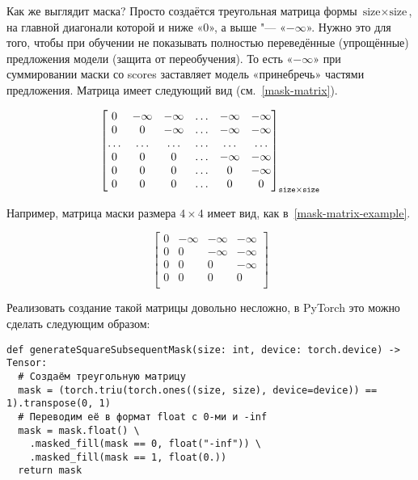 Как же выглядит маска? Просто создаётся треугольная матрица формы $ \text{size} \times \text{size} $, на главной диагонали которой и ниже «$0$», а выше "--- «$-\infty$». Нужно это для того, чтобы при обучении не показывать полностью переведённые (упрощённые) предложения модели (защита от переобучения). То есть «$-\infty$» при суммировании маски со scores заставляет модель «принебречь» частями предложения. Матрица имеет следующий вид (см.~\eqref{mask-matrix}).

\begin{equation}\label{mask-matrix}%
  \begin{bmatrix}
    0 & -\infty & -\infty & \ldots & -\infty & -\infty \\
    0 & 0 & -\infty & \ldots & -\infty & -\infty \\ 
    \ldots & \ldots & \ldots & \ldots & \ldots & \ldots \\ 
    0 & 0 & 0 & \ldots & -\infty & -\infty \\ 
    0 & 0 & 0 & \ldots & 0 & -\infty \\ 
    0 & 0 & 0 & \ldots & 0 & 0 \\ 
  \end{bmatrix}_{\text{\texttt{size}} \times \text{\texttt{size}}}  
\end{equation}

Например, матрица маски размера $ 4\times4 $ имеет вид, как в~\eqref{mask-matrix-example}.

\begin{equation}\label{mask-matrix-example}%
  \begin{bmatrix}
    0 & -\infty & -\infty & -\infty \\
    0 & 0 & -\infty & -\infty \\ 
    0 & 0 & 0 & -\infty \\ 
    0 & 0 & 0 & 0 \\ 
  \end{bmatrix}  
\end{equation}

Реализовать создание такой матрицы довольно несложно, в PyTorch это можно сделать следующим образом:

\begin{verbatim}
def generateSquareSubsequentMask(size: int, device: torch.device) -> Tensor:
  # Создаём треугольную матрицу
  mask = (torch.triu(torch.ones((size, size), device=device)) == 1).transpose(0, 1)
  # Переводим её в формат float с 0-ми и -inf
  mask = mask.float() \
    .masked_fill(mask == 0, float("-inf")) \
    .masked_fill(mask == 1, float(0.))
  return mask
\end{verbatim}


